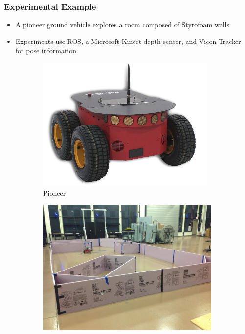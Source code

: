 \documentclass[11pt,professionalfonts,hyperref={pdftex,pdfpagemode=none,pdfstartview=FitH}]{beamer}
\begin{document}
\begin{frame}
\end{frame}





\begin{frame}
\frametitle{Experimental Example}
\begin{itemize}
        	\item A pioneer ground vehicle explores a room composed of Styrofoam walls
	\item Experiments use ROS, a Microsoft Kinect depth sensor, and Vicon Tracker for pose information
\end{itemize}
\begin{figure}
	\centering
    	\begin{subfigure}[b]{0.28\textwidth}
        		\includegraphics[width=\textwidth]{pioneer.png}
        		\caption*{Pioneer}
    	\end{subfigure}    	
	\hspace*{0.04\textwidth}
	\begin{subfigure}[b]{0.28\textwidth}
        		\includegraphics[width=\textwidth]{test_setup_1.jpg}

\end{subfigure}
\end{figure}
\end{frame}
\end{document}

